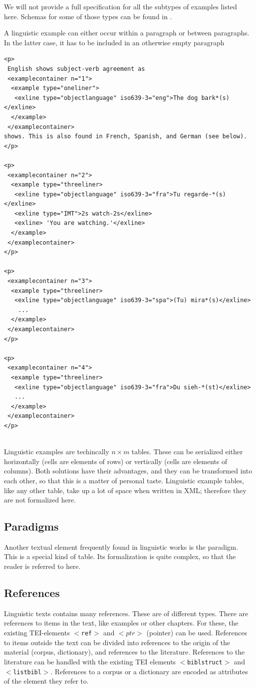 \documentclass[a4paper,10pt]{article}
\newcommand{\teitag}[1]{\texttt{$<$#1$>$}}
\begin{document}
We will not provide a full specification for all the subtypes of examples listed here. Schemas for some of those types can be found in \citet{BowEtAl2003}.

A linguistic example can either occur within a paragraph or between paragraphs. In the latter case, it has to be included in an otherwise empty paragraph

\begin{verbatim}
<p>
 English shows subject-verb agreement as 
 <examplecontainer n="1">
  <example type="oneliner"> 
   <exline type="objectlanguage" iso639-3="eng">The dog bark*(s)</exline>
  </example>
 </examplecontainer>
shows. This is also found in French, Spanish, and German (see below).
</p>

<p>
 <examplecontainer n="2">
  <example type="threeliner>
   <exline type="objectlanguage" iso639-3="fra">Tu regarde-*(s)</exline>
   <exline type="IMT">2s watch-2s</exline>
   <exline> 'You are watching.'</exline>
  </example>
 </examplecontainer>
</p>

<p>
 <examplecontainer n="3">
  <example type="threeliner>
   <exline type="objectlanguage" iso639-3="spa">(Tu) mira*(s)</exline>
    ...
  </example>
 </examplecontainer>
</p>

<p>
 <examplecontainer n="4">
  <example type="threeliner>
   <exline type="objectlanguage" iso639-3="fra">Du sieh-*(st)</exline>
   ...
  </example>
 </examplecontainer>
</p>
 
\end{verbatim}

Linguistic examples are techincally $n\times m$ tables. These can be serialized either horizontally (cells are elements of rows) or vertically (cells are elements of columns). Both solutions have their advantages, and they can be transformed into each other, so that this is a matter of personal taste. Linguistic example tables, like any other table, take up a lot of space when written in XML; therefore they are not formalized here. 

\subsection{Paradigms}
Another textual element frequently found in linguistic works is the paradigm. This is a special kind of table. Its formalization is quite complex, so that the reader is referred to \citet{PentonEtAl2004} here.

\subsection{References}
Linguistic texts contains many references. These are of different types. There are references to items in the text, like examples or other chapters. For these, the existing TEI-elements \texttt{$<$ref$>$} and \texttt{$<ptr>$} (pointer) can be used. References to items outside the text can be divided into references to the origin of the material (corpus, dictionary), and references to the literature. References to the literature can be handled with the existing TEI elements \teitag{biblstruct} and \teitag{listbibl}. References to a corpus or a dictionary are encoded as attributes of the element they refer to.
\end{document}
